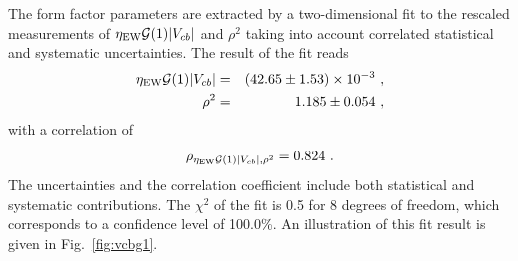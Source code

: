 The form factor parameters are extracted by a two-dimensional fit to
the rescaled measurements of $\eta_\mathrm{EW}{\cal G}(1)|V_{cb}|$ and
$\rho^2$ taking into account correlated statistical and systematic
uncertainties. The result of the fit reads
\begin{eqnarray}
  \eta_\mathrm{EW}{\cal G}(1)|V_{cb}| & = & (42.65\pm 1.53)\times
  10^{-3}~, \label{eq:vcbg1} \\
  \rho^2 & = & 1.185 \pm 0.054~,
\end{eqnarray}
with a correlation of
\begin{equation}
  \rho_{\eta_\mathrm{EW}{\cal G}(1)|V_{cb}|,\rho^2} = 0.824~.
\end{equation}
The uncertainties and the correlation coefficient include both
statistical and systematic contributions. The $\chi^2$ of the fit is
0.5 for 8 degrees of freedom, which corresponds to a confidence
level of 100.0\%. An illustration of this fit result is given in
Fig.~\ref{fig:vcbg1}.
